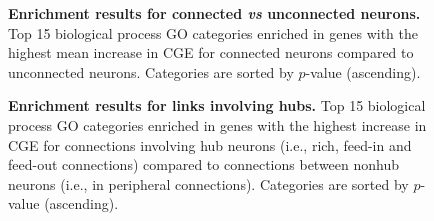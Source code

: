 \begin{figure}[h!]
   \caption{{\bf Enrichment results for connected \textit{vs} unconnected neurons.} Top 15 biological process GO categories enriched in genes with the highest mean increase in CGE for connected neurons compared to unconnected neurons.
Categories are sorted by $p$-value (ascending).}
\label{tab:enrichmentCON}
\end{figure}

\begin{figure}[h!]
   \caption{{\bf Enrichment results for links involving hubs.} Top 15 biological process GO categories enriched in genes with the highest increase in CGE for connections involving hub neurons (i.e., rich, feed-in and feed-out connections) compared to connections between nonhub neurons (i.e., in peripheral connections).
Categories are sorted by $p$-value (ascending).}
\label{tab:enrichmentRICH}
\end{figure}

